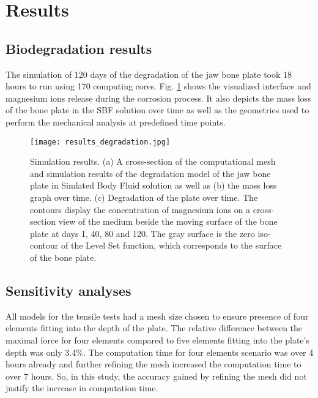 
\section{Results}
\label{sec:results}

\subsection{Biodegradation results}

The simulation of 120 days of the degradation of the jaw bone plate took 18 hours to run using 170 computing cores. Fig. \ref{fig:results_degradation} shows the visualized interface and magnesium ions release during the corrosion process. It also depicts the mass loss of the bone plate in the SBF solution over time as well as the geometries used to perform the mechanical analysis at predefined time points.

\begin{figure}[t]
\center \texttt{[image: results\_degradation.jpg]}
\caption[Simulation results of the degradation model of the jaw bone plate]{Simulation results. (a) A cross-section of the computational mesh and simulation results of the degradation model of the jaw bone plate in Simlated Body Fluid solution as well as (b) the mass loss graph over time. (c) Degradation of the plate over time. The contours display the concentration of magnesium ions on a cross-section view of the medium beside the moving surface of the bone plate at days 1, 40, 80 and 120. The gray surface is the zero iso-contour of the Level Set function, which corresponds to the surface of the bone plate.} \label{fig:results_degradation}
\end{figure}


\subsection{Sensitivity analyses}

All models for the tensile tests had a mesh size chosen to ensure presence of four elements fitting into the depth of the plate. The relative difference between the maximal force for four elements compared to five elements fitting into the plate’s depth was only 3.4\%. The computation time for four elements scenario was over 4 hours already and further refining the mesh increased the computation time to over 7 hours. So, in this study, the accuracy gained by refining the mesh did not justify the increase in computation time.

